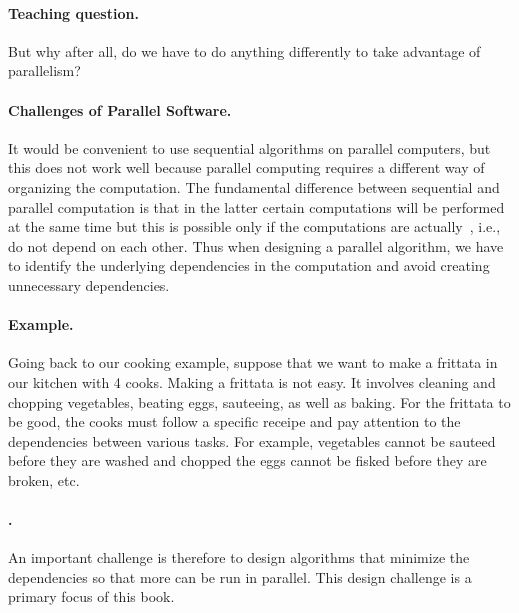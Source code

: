 \paragraph{Teaching question.}
But why after all, do we have to do anything differently to take
advantage of parallelism?

\paragraph{Challenges of Parallel Software.}
It would be convenient to use sequential algorithms on parallel
computers, but this does not work well because parallel computing
requires a different way of organizing the computation.
%
The fundamental difference between sequential and parallel computation
is that in the latter certain computations will be performed at the
same time but this is possible only if the computations are actually~, i.e., do not depend on each other.
%
Thus when designing a parallel algorithm, we have to identify the
underlying dependencies in the computation and avoid creating
unnecessary dependencies.

\paragraph{Example.}
Going back to our cooking example, suppose that we want to make a
frittata in our kitchen with 4 cooks.
%
Making a frittata is not easy.
%
It involves cleaning and chopping vegetables, beating eggs,
sauteeing, as well as baking.
%
For the frittata to be good, the cooks must follow a specific receipe
and pay attention to the dependencies between various tasks.
%
For example,
%
vegetables cannot be sauteed before they are washed and chopped
%
the eggs cannot be fisked before they are broken, etc.
%

\paragraph{.}
An important challenge is therefore to design algorithms that minimize
the dependencies so that more can be run in parallel.
%
This design challenge is a primary focus of this book. 

